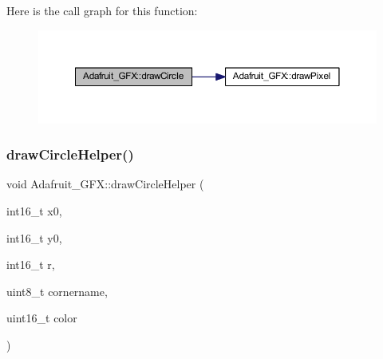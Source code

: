 Here is the call graph for this function\+:
\nopagebreak
\begin{figure}[H]
\begin{center}
\leavevmode
\includegraphics[width=350pt]{d9/d97/class_adafruit___g_f_x_a648d2d6765e488b4556e802167d885fb_cgraph}
\end{center}
\end{figure}
\mbox{\label{class_adafruit___g_f_x_a3f2dd7b698e7b95ebf9fecf992ff802e}} 
\subsubsection{\texorpdfstring{draw\+Circle\+Helper()}{drawCircleHelper()}}
{\footnotesize\ttfamily void Adafruit\+\_\+\+G\+F\+X\+::draw\+Circle\+Helper (\begin{DoxyParamCaption}\item[{int16\+\_\+t}]{x0,  }\item[{int16\+\_\+t}]{y0,  }\item[{int16\+\_\+t}]{r,  }\item[{uint8\+\_\+t}]{cornername,  }\item[{uint16\+\_\+t}]{color }\end{DoxyParamCaption})}

